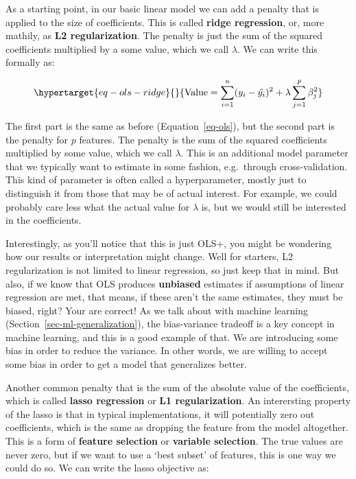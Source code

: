 \documentclass[
  letterpaper,
]{krantz}
\begin{document}
As a starting point, in our basic linear model we can add a penalty that
is applied to the size of coefficients. This is called \textbf{ridge
regression}, or, more mathily, as \textbf{L2 regularization}. The
penalty is just the sum of the squared coefficients multiplied by a some
value, which we call \(\lambda\). We can write this formally as:

\begin{equation}\protect\hypertarget{eq-ols-ridge}{}{
\textrm{Value} = \sum_{i=1}^{n} (y_i - \hat{y_i})^2 + \lambda \sum_{j=1}^{p} \beta_j^2
}\label{eq-ols-ridge}\end{equation}

The first part is the same as before (Equation~\ref{eq-ols}), but the
second part is the penalty for \(p\) features. The penalty is the sum of
the squared coefficients multiplied by some value, which we call
\(\lambda\). This is an additional model parameter that we typically
want to estimate in some fashion, e.g.~through cross-validation. This
kind of parameter is often called a hyperparameter, mostly just to
distinguish it from those that may be of actual interest. For example,
we could probably care less what the actual value for \(\lambda\) is,
but we would still be interested in the coefficients.

Interestingly, as you'll notice that this is just OLS+, you might be
wondering how our results or interpretation might change. Well for
starters, L2 regularization is not limited to linear regression, so just
keep that in mind. But also, if we know that OLS produces
\textbf{unbiased} estimates if assumptions of linear regression are met,
that means, if these aren't the same estimates, they must be biased,
right? Your are correct! As we talk about with machine learning
(Section~\ref{sec-ml-generalization}), the bias-variance tradeoff is a
key concept in machine learning, and this is a good example of that. We
are introducing some bias in order to reduce the variance. In other
words, we are willing to accept some bias in order to get a model that
generalizes better.

Another common penalty that is the sum of the absolute value of the
coefficients, which is called \textbf{lasso regression} or \textbf{L1
regularization}. An interersting property of the lasso is that in
typical implementations, it will potentially zero out coefficients,
which is the same as dropping the feature from the model altogether.
This is a form of \textbf{feature selection} or \textbf{variable
selection}. The true values are never zero, but if we want to use a
`best subset' of features, this is one way we could do so. We can write
the lasso objective as:
\end{document}

